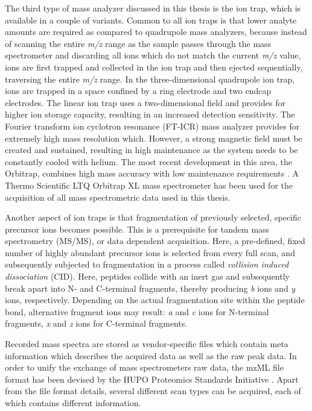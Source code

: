 
The third type of mass analyzer discussed in this thesis is the ion trap,
which is available in a couple of variants.
Common to all ion traps is that lower analyte amounts are required as
compared to quadrupole mass analyzers, because instead of scanning
the entire {\em m/z} range as the sample passes through the mass spectrometer 
and discarding all ions which do not match the current {\em m/z} value, 
ions are first trapped and collected in the ion trap and then ejected 
sequentially, traversing the entire {\em m/z} range.
In the three-dimensional quadrupole ion trap, ions are trapped in a space
confined by a ring electrode and two endcap electrodes.
The linear ion trap uses a two-dimensional field and provides for higher ion
storage capacity, resulting in an increased detection sensitivity.
The Fourier transform ion cyclotron resonance (FT-ICR) mass analyzer provides
for extremely high mass resolution which.
However, a strong magnetic field must be created and sustained, resulting
in high maintenance as the system needs to be constantly cooled with helium. 
The most recent development in this area, the Orbitrap, combines high mass 
accuracy with low maintenance requirements \citep{Hu2005}. 
A Thermo Scientific LTQ Orbitrap XL mass spectrometer has been used for the
acquisition of all mass spectrometric data used in this thesis.

Another aspect of ion traps is that fragmentation of previously selected,
specific precursor ions becomes possible.
This is a prerequisite for tandem mass spectrometry (MS/MS), or data dependent
acquisition.
Here, a pre-defined, fixed number of highly abundant precursor ions is selected
from every full scan, and subsequently subjected to fragmentation
in a process called {\em collision induced dissociation} (CID).
Here, peptides collide with an inert gas and subsequently break apart into 
N- and C-terminal fragments, thereby producing {\em b} ions and {\em y} ions, 
respectively. 
Depending on the actual fragmentation site within the peptide bond,
alternative fragment ions may result: {\em a} and {\em c} ions for N-terminal
fragments, {\em x} and {\em z} ions for C-terminal fragments.


Recorded mass spectra are stored as vendor-specific files which contain meta 
information which describes the acquired data as well as the raw peak data.
In order to unify the exchange of mass spectrometers raw data, the mzML file 
format has been devised by the HUPO Proteomics Standards Initiative
\citep{Deutsch2008}.
Apart from the file format details, several different scan types can be
acquired, each of which contains different information.


